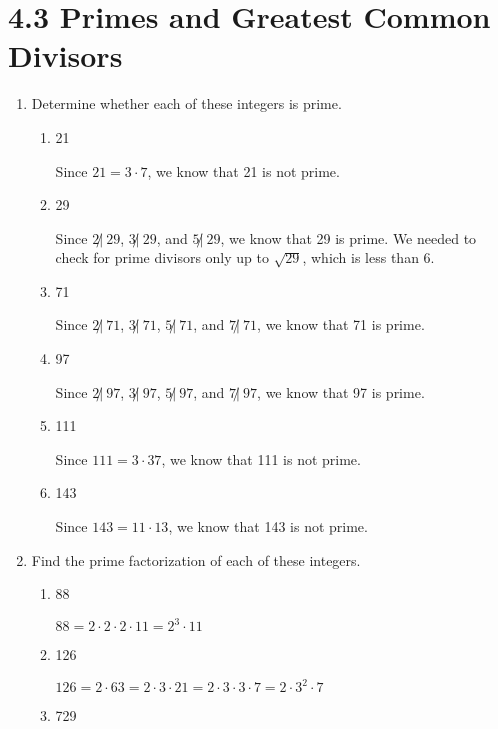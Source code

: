\documentclass[11pt]{article}
\begin{document}
\section*{\textbf{4.3 Primes and Greatest Common Divisors}}
\begin{enumerate}[label=\textbf{\arabic*.}]
	\item Determine whether each of these integers is prime.
	
	\begin{enumerate}[label=\textbf{\alph*)}]
		\item 21
		
		Since $21 = 3 \cdot 7$, we know that 21 is not prime.
		
		\item 29
		
		Since $2 \not|\ 29$, $3 \not|\ 29$, and $5 \not|\ 29$, we know that 29 is prime. We needed to check for prime divisors only up to $\sqrt{29}$, which is less than 6.
		
		\item 71
		
		Since $2 \not|\ 71$, $3 \not|\ 71$, $5 \not|\ 71$, and $7 \not|\ 71$, we know that 71 is prime.
		
		\item 97
		
		Since $2 \not|\ 97$, $3 \not|\ 97$, $5 \not|\ 97$, and $7 \not|\ 97$, we know that 97 is prime.
		
		\item 111
		
		Since $111 = 3 \cdot 37$, we know that 111 is not prime.
		
		\item 143
		
		Since $143 = 11 \cdot 13$, we know that 143 is not prime.
	\end{enumerate}

	\item Find the prime factorization of each of these integers.
	
	\begin{enumerate}[label=\textbf{\alph*)}]
		\item 88
		
		$88 = 2 \cdot 2 \cdot 2 \cdot 11 = 2^3 \cdot 11$
		
		\item 126
		
		$126 = 2 \cdot 63 = 2 \cdot 3 \cdot 21 = 2 \cdot 3 \cdot 3 \cdot 7 = 2 \cdot 3^2 \cdot 7$
		
		\item 729
		

\end{enumerate}
\end{enumerate}
\end{document}
